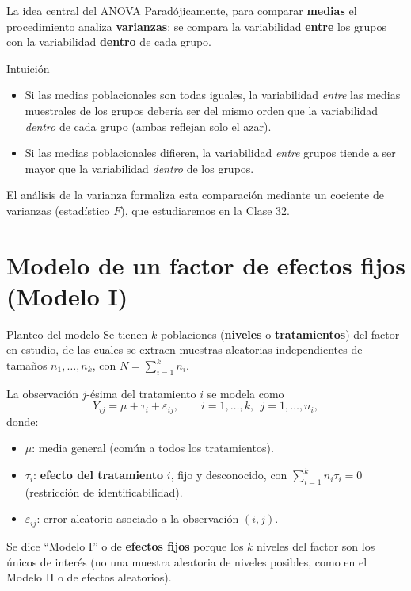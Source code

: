 \documentclass[aspectratio=169,11pt]{beamer}
\begin{document}
\begin{frame}{La idea central del ANOVA}
Paradójicamente, para comparar \textbf{medias} el procedimiento analiza \textbf{varianzas}: se compara la variabilidad \textbf{entre} los grupos con la variabilidad \textbf{dentro} de cada grupo.

\begin{block}{Intuición}
\begin{itemize}
\item Si las medias poblacionales son todas iguales, la variabilidad \emph{entre} las medias muestrales de los grupos debería ser del mismo orden que la variabilidad \emph{dentro} de cada grupo (ambas reflejan solo el azar).
\item Si las medias poblacionales difieren, la variabilidad \emph{entre} grupos tiende a ser mayor que la variabilidad \emph{dentro} de los grupos.
\end{itemize}
\end{block}

El análisis de la varianza formaliza esta comparación mediante un cociente de varianzas (estadístico $F$), que estudiaremos en la Clase 32.
\end{frame}

\section{Modelo de un factor de efectos fijos (Modelo I)}

\begin{frame}{Planteo del modelo}
Se tienen $k$ poblaciones (\textbf{niveles} o \textbf{tratamientos}) del factor en estudio, de las cuales se extraen muestras aleatorias independientes de tamaños $n_1,\dots,n_k$, con $N=\sum_{i=1}^k n_i$.

\begin{definition}
La observación $j$-ésima del tratamiento $i$ se modela como
\[
Y_{ij} = \mu + \tau_i + \varepsilon_{ij}, \qquad i=1,\dots,k,\ \ j=1,\dots,n_i,
\]
donde:
\begin{itemize}
\item $\mu$: media general (común a todos los tratamientos).
\item $\tau_i$: \textbf{efecto del tratamiento} $i$, fijo y desconocido, con $\displaystyle\sum_{i=1}^k n_i\tau_i = 0$ (restricción de identificabilidad).
\item $\varepsilon_{ij}$: error aleatorio asociado a la observación $(i,j)$.
\end{itemize}
\end{definition}

Se dice ``Modelo I'' o de \textbf{efectos fijos} porque los $k$ niveles del factor son los únicos de interés (no una muestra aleatoria de niveles posibles, como en el Modelo II o de efectos aleatorios).
\end{frame}
\end{document}
